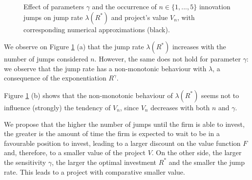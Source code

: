 \begin{figure}[!htb]
	\begin{subfigmatrix}{2}
	\end{subfigmatrix}
	\caption{Effect of parameters $\gamma$ and the occurrence of $n\in \{1,...,5\}$ innovation jumps on jump rate $\lambda(R^*)$ and project's value $V_n$, with corresponding numerical approximations (black). }
	\label{fig:max_n}
\end{figure}


We observe on Figure \ref{fig:max_n} (a) that the jump rate $\lambda(R^*)$ increases with the number of jumps considered $n$. However, the same does not hold for parameter $\gamma$: we observe that the jump rate has a non-monotonic behaviour with $\lambda$, a consequence of the exponentiation $R^\gamma$.



Figure \ref{fig:max_n} (b) shows that the non-monotonic behaviour of $\lambda(R^*)$ seems not to influence (strongly) the tendency of $V_n$, since $V_n$ decreases with both $n$ and $\gamma$.

We propose that the higher the number of jumps until the firm is able to invest, the greater is the amount of time the firm is expected to wait to be in a favourable position to invest, leading to a larger discount on the value function $F$ and, therefore, to a smaller value of the project $V$. 
On the other side, the larger the sensitivity $\gamma$, the larger the optimal investment $R^*$ and the smaller the jump rate. This leads to a project with comparative smaller value.


